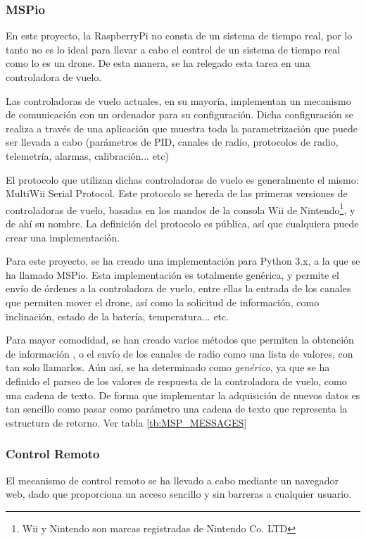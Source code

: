 \subsubsection{MSPio}

En este proyecto, la RaspberryPi no consta de un sistema de tiempo real, por lo tanto no es lo ideal para llevar a cabo el control de un sistema de tiempo real como lo es un drone. De esta manera, se ha relegado esta tarea en una controladora de vuelo. 

Las controladoras de vuelo actuales, en su mayoría, implementan un mecanismo de comunicación con un ordenador para su configuración. 
Dicha configuración se realiza a través de una aplicación que muestra toda la parametrización que puede ser llevada a cabo (parámetros de PID, canales de radio, protocolos de radio, telemetría, alarmas, calibración... etc)

El protocolo que utilizan dichas controladoras de vuelo es generalmente el mismo: MultiWii Serial Protocol. 
Este protocolo se hereda de las primeras versiones de controladoras de vuelo, basadas en los mandos de la consola Wii de Nintendo\footnote{Wii y Nintendo son marcas registradas de Nintendo Co. LTD}, y de ahí su nombre.
La definición del protocolo es pública, así que cualquiera puede crear una implementación. 

Para este proyecto, se ha creado una implementación para Python 3.x, a la que se ha llamado MSPio.
Esta implementación es totalmente genérica, y permite el envío de órdenes a la controladora de vuelo, entre ellas la entrada de los canales que permiten mover el drone, así como la solicitud de información, como inclinación, estado de la batería, temperatura... etc.

Para mayor comodidad, se han creado varios métodos que permiten la obtención de información , o el envío de los canales de radio como una lista de valores, con tan solo llamarlos. Aún así, se ha determinado como \emph{genérico}, ya que se ha definido el parseo de los valores de respuesta de la controladora de vuelo, como una cadena de texto.
De forma que implementar la adquisición de nuevos datos es tan sencillo como pasar como parámetro una cadena de texto que representa la estructura de retorno. Ver tabla \ref{tb:MSP_MESSAGES}

\subsubsection{Control Remoto}

El mecanismo de control remoto se ha llevado a cabo mediante un navegador web, dado que proporciona un acceso sencillo y sin barreras a cualquier usuario. 

